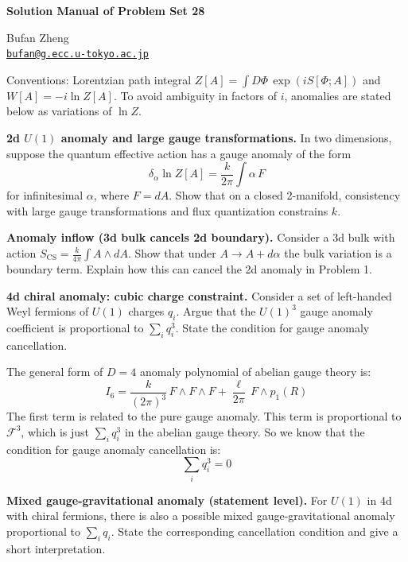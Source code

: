 \resetproblem
\begin{center}
    {\LARGE \textbf{Solution Manual of Problem Set 28} \par}
    \vspace{1em}
    {\large Bufan Zheng\\ \href{mailto:bufan@g.ecc.u-tokyo.ac.jp}{\texttt{bufan@g.ecc.u-tokyo.ac.jp}} \par}
\end{center}

\noindent Conventions: Lorentzian path integral \(Z[A]=\int D\Phi\,\exp(iS[\Phi;A])\) and \(W[A]=-i\ln Z[A]\). To avoid ambiguity in factors of \(i\), anomalies are stated below as variations of \(\ln Z\).

\begin{problem}
    \textbf{2d \(U(1)\) anomaly and large gauge transformations.} In two dimensions, suppose the quantum effective action has a gauge anomaly of the form
    \[
        \delta_\alpha\ln Z[A]=\frac{k}{2\pi}\int \alpha\,F
    \]
    for infinitesimal \(\alpha\), where \(F=dA\). Show that on a closed 2-manifold, consistency with large gauge transformations and flux quantization constrains \(k\).
\end{problem}
\begin{problem}
    \textbf{Anomaly inflow (3d bulk cancels 2d boundary).} Consider a 3d bulk with action \(S_{\text{CS}}=\frac{k}{4\pi}\int A\wedge dA\). Show that under \(A\to A+d\alpha\) the bulk variation is a boundary term. Explain how this can cancel the 2d anomaly in Problem 1.
\end{problem}
\begin{problem}
    \textbf{4d chiral anomaly: cubic charge constraint.} Consider a set of left-handed Weyl fermions of \(U(1)\) charges \(q_i\). Argue that the \(U(1)^3\) gauge anomaly coefficient is proportional to \(\sum_i q_i^3\). State the condition for gauge anomaly cancellation.
\end{problem}
\begin{solution}[28.4]
	The general form of $D=4$ anomaly polynomial of abelian gauge theory is:
	\[
	I_6=\frac{k}{(2\pi)^3}\,F \wedge F \wedge F + \frac{\ell}{2\pi}\,F \wedge p_1(R)
	\]
	The first term is related to the pure gauge anomaly. This term is proportional to $\mathcal{F}^3$, which is just $\sum_i q_i^3$ in the abelian gauge theory. So we know that the condition for gauge anomaly cancellation is:
	\[
	\boxed{
	\sum_i q_i^3=0
}
	\]
\end{solution}
\begin{problem}
    \textbf{Mixed gauge-gravitational anomaly (statement level).} For \(U(1)\) in 4d with chiral fermions, there is also a possible mixed gauge-gravitational anomaly proportional to \(\sum_i q_i\). State the corresponding cancellation condition and give a short interpretation.
\end{problem}

